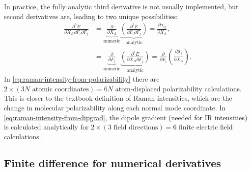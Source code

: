 \documentclass[%
class = book,%
crop = false,%
float = true,%
multi = true,%
preview = false,%
]{standalone}
\let\cite\autocite
\begin{document}
In practice, the fully analytic third derivative is not usually implemented, but second derivatives are, leading to two unique possibilities:
\begin{align}
  \label{eq:raman-intensity-from-polarizability}
  \frac{\partial^{3} E}{\partial X_{A} \partial F_{i} \partial F_{j}} &= \underbrace{\frac{\partial}{\partial X_{A}}}_{\text{numeric}} \underbrace{\left(\frac{\partial^{2} E}{\partial F_{i} \partial F_{j}}\right)}_{\text{analytic}} = \frac{\partial \alpha_{ij}}{\partial X_{A}}, \\
  \label{eq:raman-intensity-from-dipgrad}
  &= \underbrace{\frac{\partial}{\partial F_{i}}}_{\text{numeric}} \underbrace{\left(\frac{\partial^{2} E}{\partial X_{A} \partial F_{j}}\right)}_{\text{analytic}} = \frac{\partial}{\partial F_{i}} \left( \frac{\partial \mu_{j}}{\partial X_{A}} \right).
\end{align}
In \eqref{eq:raman-intensity-from-polarizability} there are \(2 \times (3N \,\,\text{atomic coordinates}) = 6N\) atom-displaced polarizability calculations. This is closer to the textbook definition of Raman intensities, which are the change in molecular polarizability along each normal mode coordinate\cite{TODO}. In \eqref{eq:raman-intensity-from-dipgrad}, the dipole gradient (needed for IR intensities) is calculated analytically for \(2 \times (3 \,\,\text{field directions}) = 6\) finite electric field calculations.

\subsection{Finite difference for numerical derivatives}
\label{ssec:finite-difference-for-numerical-derivatives}

\end{document}

